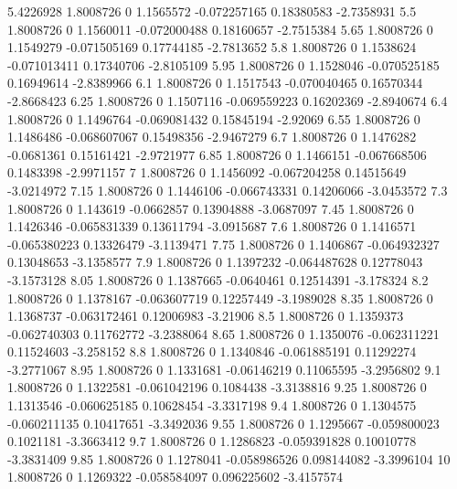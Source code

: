 \documentclass[compact]{ne630handout}
\begin{document}
{5.4226928 1.8008726 0 1.1565572 -0.072257165 0.18380583 -2.7358931
5.5 1.8008726 0 1.1560011 -0.072000488 0.18160657 -2.7515384
5.65 1.8008726 0 1.1549279 -0.071505169 0.17744185 -2.7813652
5.8 1.8008726 0 1.1538624 -0.071013411 0.17340706 -2.8105109
5.95 1.8008726 0 1.1528046 -0.070525185 0.16949614 -2.8389966
6.1 1.8008726 0 1.1517543 -0.070040465 0.16570344 -2.8668423
6.25 1.8008726 0 1.1507116 -0.069559223 0.16202369 -2.8940674
6.4 1.8008726 0 1.1496764 -0.069081432 0.15845194 -2.92069
6.55 1.8008726 0 1.1486486 -0.068607067 0.15498356 -2.9467279
6.7 1.8008726 0 1.1476282 -0.0681361 0.15161421 -2.9721977
6.85 1.8008726 0 1.1466151 -0.067668506 0.1483398 -2.9971157
7 1.8008726 0 1.1456092 -0.067204258 0.14515649 -3.0214972
7.15 1.8008726 0 1.1446106 -0.066743331 0.14206066 -3.0453572
7.3 1.8008726 0 1.143619 -0.0662857 0.13904888 -3.0687097
7.45 1.8008726 0 1.1426346 -0.065831339 0.13611794 -3.0915687
7.6 1.8008726 0 1.1416571 -0.065380223 0.13326479 -3.1139471
7.75 1.8008726 0 1.1406867 -0.064932327 0.13048653 -3.1358577
7.9 1.8008726 0 1.1397232 -0.064487628 0.12778043 -3.1573128
8.05 1.8008726 0 1.1387665 -0.0640461 0.12514391 -3.178324
8.2 1.8008726 0 1.1378167 -0.063607719 0.12257449 -3.1989028
8.35 1.8008726 0 1.1368737 -0.063172461 0.12006983 -3.21906
8.5 1.8008726 0 1.1359373 -0.062740303 0.11762772 -3.2388064
8.65 1.8008726 0 1.1350076 -0.062311221 0.11524603 -3.258152
8.8 1.8008726 0 1.1340846 -0.061885191 0.11292274 -3.2771067
8.95 1.8008726 0 1.1331681 -0.06146219 0.11065595 -3.2956802
9.1 1.8008726 0 1.1322581 -0.061042196 0.1084438 -3.3138816
9.25 1.8008726 0 1.1313546 -0.060625185 0.10628454 -3.3317198
9.4 1.8008726 0 1.1304575 -0.060211135 0.10417651 -3.3492036
9.55 1.8008726 0 1.1295667 -0.059800023 0.1021181 -3.3663412
9.7 1.8008726 0 1.1286823 -0.059391828 0.10010778 -3.3831409
9.85 1.8008726 0 1.1278041 -0.058986526 0.098144082 -3.3996104
10 1.8008726 0 1.1269322 -0.058584097 0.096225602 -3.4157574
}\milddata
\end{document}
